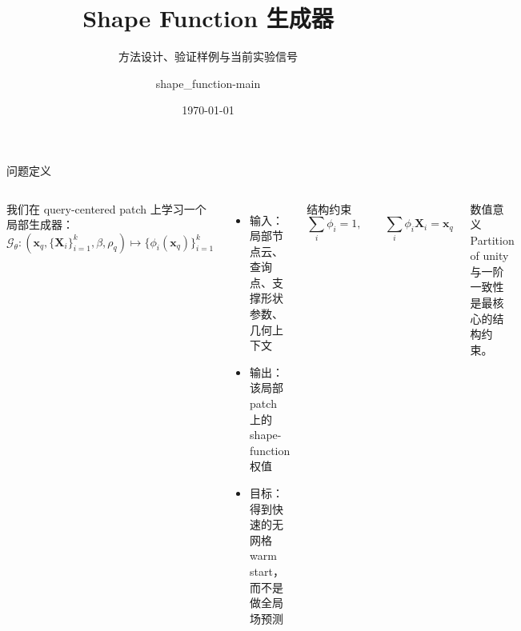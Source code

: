 \documentclass[10pt,aspectratio=169]{beamer}
\title{Shape Function 生成器}
\subtitle{方法设计、验证样例与当前实验信号}
\author{shape\_function-main}
\date{\today}
\newcommand{\xq}{\mathbf{x}_q}
\newcommand{\Xnode}{\mathbf{X}_i}
\newcommand{\phii}{\phi_i(\mathbf{x}_q)}
\begin{document}
\maketitle

\begin{frame}{问题定义}
  \begin{columns}[T,onlytextwidth]
      我们在 query-centered patch 上学习一个局部生成器：
      \[
      \mathcal{G}_{\theta}:
      \left(
      \xq,\{\Xnode\}_{i=1}^{k},\beta,\rho_q
      \right)
      \mapsto
      \{\phii\}_{i=1}^{k}
      \]

      \vspace{0.5em}
      \begin{itemize}
        \item 输入：局部节点云、查询点、支撑形状参数、几何上下文
        \item 输出：该局部 patch 上的 shape-function 权值
        \item 目标：得到快速的无网格 warm start，而不是做全局场预测
      \end{itemize}

      \begin{block}{结构约束}
        \[
        \sum_i \phi_i = 1,
        \qquad
        \sum_i \phi_i \Xnode = \xq
        \]
      \end{block}

      \begin{alertblock}{数值意义}
        Partition of unity 与一阶一致性是最核心的结构约束。
      \end{alertblock}
  \end{columns}
\end{frame}
\end{document}
